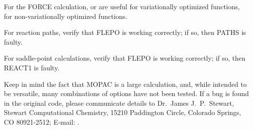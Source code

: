 For  the  FORCE  calculation,    or    are    useful  
for variationally   optimized   functions,      for 
non-variationally optimized functions.

For reaction paths, verify that FLEPO is working correctly; if  so, then PATHS
is faulty.

For  saddle-point  calculations,  verify  that  FLEPO  is   working correctly;
if so, then REACT1 is faulty.

Keep in mind the fact that MOPAC is a large calculation, and, while intended 
to  be  versatile,  many combinations of options have not been tested.  If a
bug is found in  the  original  code,  please  communicate details  to    Dr.\
James J.\ P.\ Stewart, Stewart Computational Chemistry, 15210 Paddington
Circle,   Colorado  Springs,  CO 80921-2512; E-mail:
.
